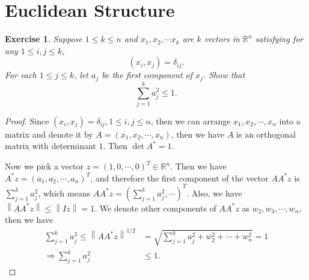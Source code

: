 \documentclass[11pt]{book}
\newtheorem{exercise}{Exercise}[section]
\theoremstyle{definition}
\numberwithin{equation}{chapter}
\begin{document}
\section{Euclidean Structure}
\begin{exercise}
Suppose $1\leq k\leq n$ and $x_{1},x_{2},\cdots x_{k}$ are $k$ vectors
in $\mathbb{R}^{n}$ satisfying for any $1\leq i,j\leq k$,%
$$
\left(  x_{i},x_{j}\right)  =\delta_{ij}.
$$
For each $1\leq j\leq k$, let $a_{j}$ be the first component of $x_{j}$. Show
that%
$$
\sum_{j=1}^{k}a_{j}^{2}\leq1.
$$
\end{exercise}
\begin{proof}
Since $(x_i,x_j) = \delta_{ij}, 1\leq i,j\leq n$, then we can arrange $x_1, x_2,\cdots, x_n$ into a matrix and denote it by $A = (x_1, x_2,\cdots, x_n)$, then we have $A$ is an orthogonal matrix with determinant $1$. Then $\det A^* = 1$. 

Now we pick a vector $z = (1,0,\cdots,0)^T \in \mathbb{R}^{n}$. Then we have $A^*z = (a_1, a_2, \cdots, a_n)^T$, and therefore the first component of the vector $AA^*z$ is $\sum_{j=1}^{k}a_{j}^{2}$, which means $AA^*z = \left(\sum_{j=1}^{k}a_{j}^{2}, \cdots \right)^T$. Also, we have $\left\|AA^*z \right\| \leq \left\| I z \right\| = 1$. We denote other components of $AA^*z$ as $w_2, w_3, \cdots, w_n$, then we have 
\begin{align*}
    \sum_{j=1}^{k}a_{j}^{2} \leq \left\|AA^*z \right\|^{1/2} & = \sqrt{\sum_{j=1}^{k}a_{j}^{2} + w_2^2 + \cdots + w_n^2} = 1 \\
    \Rightarrow \sum_{j=1}^{k}a_{j}^{2} & \leq 1.
\end{align*}
\end{proof}

\medskip
\end{document}
